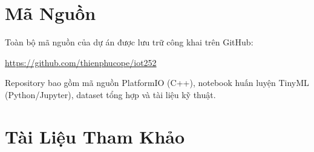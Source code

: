 \documentclass[12pt,a4paper]{article}
\begin{document}
\section*{Mã Nguồn}

Toàn bộ mã nguồn của dự án được lưu trữ công khai trên GitHub:

\begin{center}
    \url{https://github.com/thienphucope/iot252}
\end{center}

Repository bao gồm mã nguồn PlatformIO (C++), notebook huấn luyện TinyML (Python/Jupyter), dataset tổng hợp và tài liệu kỹ thuật.

\section*{Tài Liệu Tham Khảo}
\end{document}
